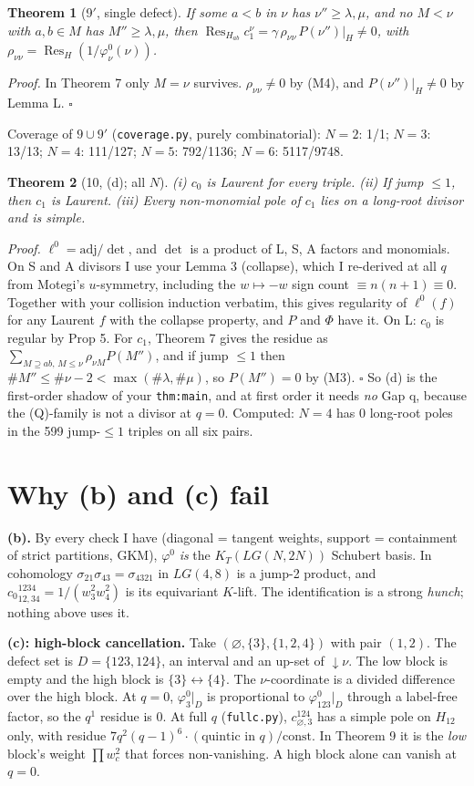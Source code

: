\documentclass[10pt]{article}
\newcommand{\Res}{\operatorname{Res}}
\theoremstyle{plain}
\newtheorem*{thm}{Theorem}
\begin{document}
\begin{thm}[9$'$, single defect]
If some $a<b$ in $\nu$ has $\nu''\ge\lambda,\mu$, and no $M<\nu$ with $a,b\in M$ has $M''\ge\lambda,\mu$, then
$\Res_{H_{ab}}c_1^\nu=\gamma\,\rho_{\nu\nu}\,P(\nu'')|_H\ne0$, with $\rho_{\nu\nu}=\Res_H(1/\varphi^0_\nu(\nu))$.
\end{thm}
\emph{Proof.} In Theorem 7 only $M=\nu$ survives. $\rho_{\nu\nu}\ne0$ by (M4), and $P(\nu'')|_H\ne0$ by Lemma L. $\square$

Coverage of $9\cup9'$ (\texttt{coverage.py}, purely combinatorial): $N=2$: 1/1; $N=3$: 13/13; $N=4$: 111/127; $N=5$: 792/1136; $N=6$: 5117/9748.

\begin{thm}[10, (d); all $N$]
(i) $c_0$ is Laurent for every triple. (ii) If jump $\le1$, then $c_1$ is Laurent. (iii) Every non-monomial pole of $c_1$ lies on a long-root divisor and is simple.
\end{thm}
\emph{Proof.} $\ell^0=\mathrm{adj}/\det$, and $\det$ is a product of L, S, A factors and monomials. On S and A divisors I use your Lemma 3 (collapse), which I
re-derived at all $q$ from Motegi's $u$-symmetry, including the $w\mapsto-w$ sign count $\equiv n(n+1)\equiv0$. Together with your collision induction
verbatim, this gives regularity of $\ell^0(f)$ for any Laurent $f$ with the collapse property, and $P$ and $\Phi$ have it. On L: $c_0$ is regular by Prop 5.
For $c_1$, Theorem 7 gives the residue as $\sum_{M\supseteq ab,\,M\le\nu}\rho_{\nu M}P(M'')$, and if jump $\le1$ then $\#M''\le\#\nu-2<\max(\#\lambda,\#\mu)$,
so $P(M'')=0$ by (M3). $\square$
So (d) is the first-order shadow of your \texttt{thm:main}, and at first order it needs \emph{no} Gap q, because the (Q)-family is not a divisor at $q=0$.
Computed: $N=4$ has 0 long-root poles in the 599 jump-$\le1$ triples on all six pairs.

\section{Why (b) and (c) fail}
\textbf{(b).} By every check I have (diagonal = tangent weights, support = containment of strict partitions, GKM), $\varphi^0$ \emph{is} the
$K_T(LG(N,2N))$ Schubert basis. In cohomology $\sigma_{21}\sigma_{43}=\sigma_{4321}$ in $LG(4,8)$ is a jump-2 product, and
${c_0}^{1234}_{12,34}=1/(w_3^2w_4^2)$ is its equivariant $K$-lift. The identification is a strong \emph{hunch}; nothing above uses it.

\textbf{(c): high-block cancellation.} Take $(\varnothing,\{3\},\{1,2,4\})$ with pair $(1,2)$. The defect set is $D=\{123,124\}$, an interval and an up-set of
${\downarrow}\nu$. The low block is empty and the high block is $\{3\}\leftrightarrow\{4\}$. The $\nu$-coordinate is a divided difference over the
high block. At $q=0$, $\varphi^0_3|_D$ is proportional to $\varphi^0_{123}|_D$ through a label-free factor, so the $q^1$ residue is $0$. At full $q$
(\texttt{fullc.py}), $c^{124}_{\varnothing,3}$ has a simple pole on $H_{12}$ only, with residue $7q^2(q-1)^6\cdot(\text{quintic in }q)/\text{const}$. In
Theorem 9 it is the \emph{low} block's weight $\prod w_c^2$ that forces non-vanishing. A high block alone can vanish at $q=0$.
\end{document}
